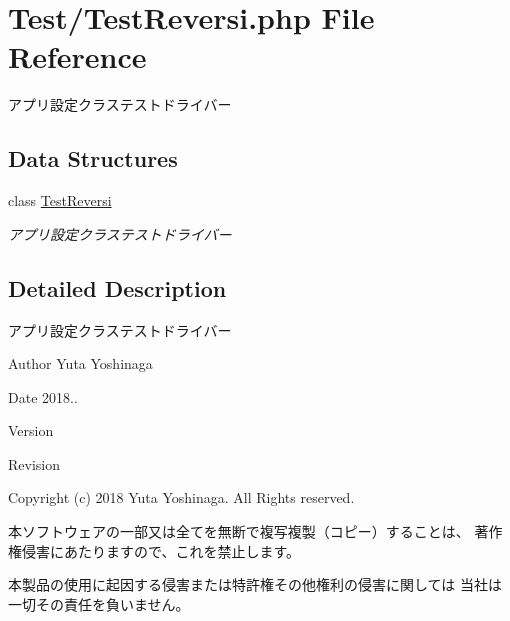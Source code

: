 \hypertarget{_test_reversi_8php}{}\section{Test/\+Test\+Reversi.php File Reference}
\label{_test_reversi_8php}


アプリ設定クラステストドライバー  


\subsection*{Data Structures}
\begin{DoxyCompactItemize}
\item 
class \hyperlink{class_test_reversi}{Test\+Reversi}
\begin{DoxyCompactList}\small\item\em アプリ設定クラステストドライバー \end{DoxyCompactList}\end{DoxyCompactItemize}


\subsection{Detailed Description}
アプリ設定クラステストドライバー 

\begin{DoxyAuthor}{Author}
Yuta Yoshinaga 
\end{DoxyAuthor}
\begin{DoxyDate}{Date}
2018.. 
\end{DoxyDate}
\begin{DoxyParagraph}{Version}

\end{DoxyParagraph}
\begin{DoxyParagraph}{Revision}

\end{DoxyParagraph}


Copyright (c) 2018 Yuta Yoshinaga. All Rights reserved.


\begin{DoxyItemize}
\item 本ソフトウェアの一部又は全てを無断で複写複製（コピー）することは、 著作権侵害にあたりますので、これを禁止します。
\item 本製品の使用に起因する侵害または特許権その他権利の侵害に関しては 当社は一切その責任を負いません。 
\end{DoxyItemize}
